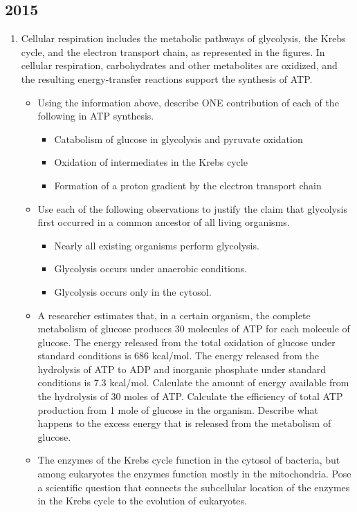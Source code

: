 \documentclass{article}
\begin{document}
\subsection{2015}
\begin{enumerate}
\item Cellular respiration includes the metabolic pathways of glycolysis, the Krebs cycle, and the electron transport
chain, as represented in the figures. In cellular respiration, carbohydrates and other metabolites are oxidized, and the
resulting energy-transfer reactions support the synthesis of ATP.
\begin{itemize}
\item Using the information above, describe ONE contribution of each of the following in ATP synthesis.
\begin{itemize}
\item Catabolism of glucose in glycolysis and pyruvate oxidation
\item Oxidation of intermediates in the Krebs cycle
\item Formation of a proton gradient by the electron transport chain
\end{itemize}
\item Use each of the following observations to justify the claim that glycolysis first occurred in a common ancestor of all living organisms.
\begin{itemize}
\item Nearly all existing organisms perform glycolysis.
\item Glycolysis occurs under anaerobic conditions.
\item Glycolysis occurs only in the cytosol.
\end{itemize}
\item A researcher estimates that, in a certain organism, the complete metabolism of glucose produces 30 molecules of ATP for each molecule of glucose. The energy released from the total oxidation of glucose
under standard conditions is 686 kcal/mol. The energy released from the hydrolysis of ATP to ADP and inorganic phosphate under standard conditions is 7.3 kcal/mol. Calculate the amount of energy available from the
hydrolysis of 30 moles of ATP. Calculate the efficiency of total ATP production from 1 mole of glucose in the organism. Describe what happens to the excess energy that is released from the metabolism of glucose.
\item The enzymes of the Krebs cycle function in the cytosol of bacteria, but among eukaryotes the enzymes function
mostly in the mitochondria. Pose a scientific question that connects the subcellular location of the enzymes in the Krebs cycle to the evolution of eukaryotes.

\end{itemize}
\end{enumerate}
\end{document}
